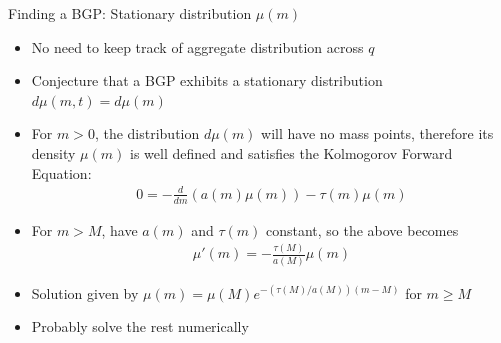 \documentclass[english,usenames,dvipsnames]{beamer}
\begin{document}
\begin{frame}{Finding a BGP: Stationary distribution $\mu(m)$}
\begin{itemize}
	\small
	\item No need to keep track of aggregate distribution across $q$
	\item Conjecture that a BGP exhibits a stationary distribution $d\mu(m,t) = d\mu(m)$
	\item For $m > 0$, the distribution $d\mu(m)$ will have no mass points, therefore its density $\mu(m)$ is well defined and satisfies the Kolmogorov Forward Equation: 
	\begin{align*}
		0 = -\frac{d}{dm} (a(m) \mu(m)) - \tau(m)\mu(m)  
	\end{align*}
	\item For $m > M$, have $a(m)$ and $\tau(m)$ constant, so the above becomes 
	\begin{align*}
		\mu'(m) = -\frac{\tau(M)}{a(M)} \mu(m)
	\end{align*}
	\item Solution given by $\mu(m) = \mu(M)e^{-(\tau(M) / a(M))(m-M)}$ for $m \ge M$
	\item Probably solve the rest numerically
\end{itemize}
\end{frame}

\end{document}

